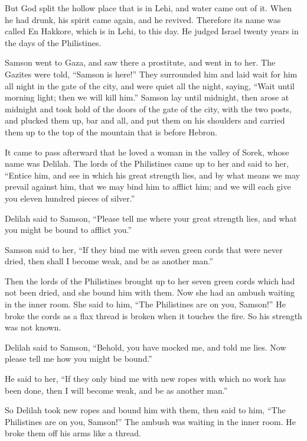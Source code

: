\myverse{}But God split the hollow place that is in Lehi, and water came
out of it. When he had drunk, his spirit came again, and he revived. Therefore its name was called En
Hakkore, which is in Lehi, to this day.
\myverse{}He judged Israel twenty years in the days of the Philistines.


\mychapter{} \myverse*{}Samson went to Gaza, and saw there a prostitute, and went in to
her.
\myverse{}The Gazites were told, “Samson is here!” They surrounded him and laid wait
for him all night in the gate of the city, and were quiet all the night, saying, “Wait until morning light;
then we will kill him.”
\myverse{}Samson lay until midnight, then arose at midnight and took hold of the doors
of the gate of the city, with the two posts, and plucked them up, bar and all, and put them on his shoulders
and carried them up to the top of the mountain that is before Hebron.

\myverse{}It came to pass afterward that he loved a woman in the valley
of Sorek, whose name was Delilah.
\myverse{}The lords of the Philistines came up to her and said to her, “Entice him, and
see in which his great strength lies, and by what means we may prevail against him, that we may bind him
to afflict him; and we will each give you eleven hundred pieces of silver.”

\myverse{}Delilah said to Samson, “Please tell me where your great strength
lies, and what you might be bound to afflict you.”

\myverse{}Samson said to her, “If they bind me with seven green cords that
were never dried, then shall I become weak, and be as another man.”

\myverse{}Then the lords of the Philistines brought up to her seven green
cords which had not been dried, and she bound him with them.
\myverse{}Now she had an ambush waiting in the inner room. She said to him, “The Philistines
are on you, Samson!” He broke the cords as a flax thread is broken when it touches the fire. So his strength
was not known.

\myverse{}Delilah said to Samson, “Behold, you have mocked me, and told
me lies. Now please tell me how you might be bound.”

\myverse{}He said to her, “If they only bind me with new ropes with which
no work has been done, then I will become weak, and be as another man.”

\myverse{}So Delilah took new ropes and bound him with them, then said
to him, “The Philistines are on you, Samson!” The ambush was waiting in the inner room. He broke them
off his arms like a thread.

